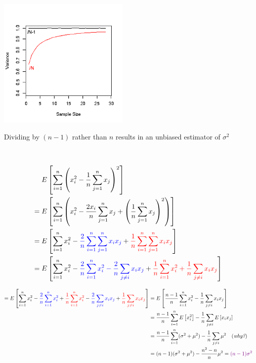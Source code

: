 \documentclass[11pt, oneside]{article}
\begin{document}
\begin{minipage}{.375\linewidth} 

   \includegraphics[width=2.5in]{fZcgG.png}  
   
   Dividing by $(n-1)$ rather than $n$ results in an unbiased estimator of $\sigma^2$\\

\end{minipage}
\begin{minipage}{.05\linewidth}
${}$
\end{minipage}
\begin{minipage}{.625\linewidth} 
\begin{align*} 
\textcolor{white}{=} {}& E\left[\sum_{i=1}^n\left(x_i^2-\frac{1}{n}\sum_{j=1}^nx_j\right)^2\right] \\
= {}& E\left[\sum_{i=1}^n\left(x_i^2-\frac{2x_i}{n}\sum_{j=1}^nx_j + 
\left(\frac{1}{n}\sum_{j=1}^nx_j\right)^2\right)\right] \\ 
= {}& E\left[\sum_{i=1}^nx_i^2-\textcolor{blue}{\frac{2}{n} \sum_{i=1}^n \sum_{j=1}^nx_ix_j} + 
\textcolor{red}{\frac{1}{n} \sum_{i=1}^n\sum_{j=1}^nx_ix_j}\right] \\ 
= {}& E\left[\sum_{i=1}^nx_i^2 - \textcolor{blue}{\frac{2}{n}\sum_{i=1}^nx_i^2 -\frac{2}{n}\sum_{j\not=i}x_ix_j} + 
\textcolor{red}{\frac{1}{n}\sum_{i=1}^nx_i^2 + \frac{1}{n}\sum_{j\not=i}x_ix_j} \right] 
\end{align*}
\end{minipage}

\begin{align*}
= E\left[\sum_{i=1}^nx_i^2 - \textcolor{blue}{\frac{2}{n}\sum_{i=1}^nx_i^2} + \textcolor{red}{\frac{1}{n}\sum_{i=1}^nx_i^2} 
 -\textcolor{blue}{\frac{2}{n}\sum_{j\not=i}x_ix_j}  
 + \textcolor{red}{\frac{1}{n}\sum_{j\not=i}x_ix_j} \right] 
 = {}& E\left[\textcolor{black}{\frac{n-1}{n}\sum_{i=1}^nx_i^2} 
 -\textcolor{black}{\frac{1}{n}\sum_{j\not=i}x_ix_j}  \right] \\  
 = {}& \textcolor{black}{\frac{n-1}{n}\sum_{i=1}^n E\left[x_i^2\right] } 
 -\textcolor{black}{\frac{1}{n} \sum_{j\not=i} E\left[x_ix_j\right] }   \\ 
 = {}& \textcolor{black}{\frac{n-1}{n}\sum_{i=1}^n (\sigma^2 + \mu^2) } 
 -\textcolor{black}{\frac{1}{n} \sum_{j\not=i} \mu^2 } \quad (\emph{\textrm{why?}})  \\ 
 = {}& \textcolor{black}{(n-1) (\sigma^2 + \mu^2) } 
 -\textcolor{black}{\frac{n^2-n}{n} \mu^2 }   =  \textcolor{violet}{(n-1)\sigma^2}
\end{align*}
\end{document}
